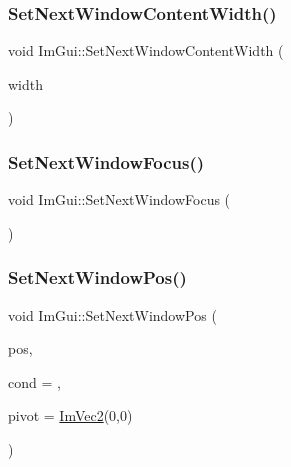\mbox{\label{namespace_im_gui_a94731b8482ed9298a9ac454061e79e8a}} 
\subsubsection{\texorpdfstring{Set\+Next\+Window\+Content\+Width()}{SetNextWindowContentWidth()}}
{\footnotesize\ttfamily void Im\+Gui\+::\+Set\+Next\+Window\+Content\+Width (\begin{DoxyParamCaption}\item[{float}]{width }\end{DoxyParamCaption})}

\mbox{\label{namespace_im_gui_ac2d2b163c95cd8c8391aba85bc50d170}} 
\subsubsection{\texorpdfstring{Set\+Next\+Window\+Focus()}{SetNextWindowFocus()}}
{\footnotesize\ttfamily void Im\+Gui\+::\+Set\+Next\+Window\+Focus (\begin{DoxyParamCaption}{ }\end{DoxyParamCaption})}

\mbox{\label{namespace_im_gui_afbccd31113430670b5ab2bf0d6f509bf}} 
\subsubsection{\texorpdfstring{Set\+Next\+Window\+Pos()}{SetNextWindowPos()}}
{\footnotesize\ttfamily void Im\+Gui\+::\+Set\+Next\+Window\+Pos (\begin{DoxyParamCaption}\item[{const \mbox{\hyperlink{struct_im_vec2}{Im\+Vec2}} \&}]{pos,  }\item[{\mbox{\hyperlink{imgui_8h_aef890d6ac872e12c5804d0b3e4f7f103}{Im\+Gui\+Cond}}}]{cond = {},  }\item[{const \mbox{\hyperlink{struct_im_vec2}{Im\+Vec2}} \&}]{pivot = {\ttfamily \mbox{\hyperlink{struct_im_vec2}{Im\+Vec2}}(0,0)} }\end{DoxyParamCaption})}

